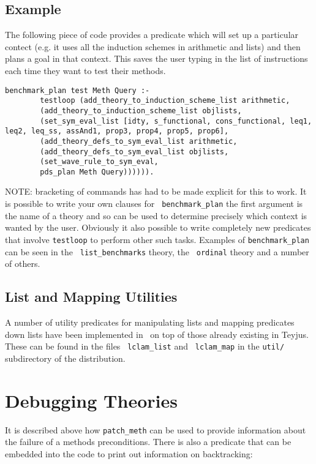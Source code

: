 \subsection*{Example}

The following piece of code provides a predicate which will set up a
particular contect (e.g. it uses all the induction schemes in
arithmetic and lists) and then plans a goal in that context.  This
saves the user typing in the list of instructions each time they want
to test their methods.
\begin{verbatim}
benchmark_plan test Meth Query :-
        testloop (add_theory_to_induction_scheme_list arithmetic,
        (add_theory_to_induction_scheme_list objlists,
        (set_sym_eval_list [idty, s_functional, cons_functional, leq1, leq2, leq_ss, assAnd1, prop3, prop4, prop5, prop6],
        (add_theory_defs_to_sym_eval_list arithmetic,
        (add_theory_defs_to_sym_eval_list objlists,
        (set_wave_rule_to_sym_eval,
        pds_plan Meth Query)))))).
\end{verbatim}
NOTE: bracketing of commands has had to be made explicit for this to
work.  It is possible to write your own clauses for {\tt
  benchmark\_plan} the first argument is the
name of a theory and so can be used to determine precisely which
context is wanted by the user.  Obviously it also possible to write
completely new predicates that involve {\tt testloop} to perform other 
such tasks.  Examples of {\tt benchmark\_plan} can be seen in the {\tt 
  list\_benchmarks} theory, the {\tt
  ordinal} theory and a number of others.

\subsection{List and Mapping Utilities}
A number of utility predicates for manipulating lists and mapping
predicates down lists have been implemented in \lclam\ on top of those 
already existing in Teyjus.  These can be found in the files {\tt
  lclam\_list} and {\tt
  lclam\_map} in the {\tt util/}
subdirectory of the distribution.

\section{Debugging Theories}

It is described above how {\tt patch\_meth} can be
used to provide information about the failure of a methods
preconditions.  There is also a predicate that can be embedded into
the code to print out information on backtracking:


